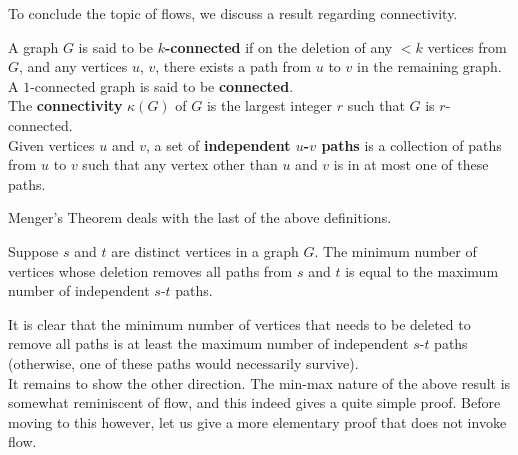 			To conclude the topic of flows, we discuss a result regarding connectivity.

			\begin{fdef}
				A graph $G$ is said to be \textbf{$k$-connected} if on the deletion of any $<k$ vertices from $G$, and any vertices $u$, $v$, there exists a path from $u$ to $v$ in the remaining graph.
				A $1$-connected graph is said to be \textbf{connected}. \\
				The \textbf{connectivity} $\kappa(G)$ of $G$ is the largest integer $r$ such that $G$ is $r$-connected.\\
				Given vertices $u$ and $v$, a set of \textbf{independent $u$-$v$ paths} is a collection of paths from $u$ to $v$ such that any vertex other than $u$ and $v$ is in at most one of these paths.
			\end{fdef}

			Menger's Theorem deals with the last of the above definitions.

			\begin{ftheo}
				Suppose $s$ and $t$ are distinct vertices in a graph $G$. The minimum number of vertices whose deletion removes all paths from $s$ and $t$ is equal to the maximum number of independent $s$-$t$ paths.
			\end{ftheo}

			It is clear that the minimum number of vertices that needs to be deleted to remove all paths is at least the maximum number of independent $s$-$t$ paths (otherwise, one of these paths would necessarily survive).\\
			It remains to show the other direction.
			The min-max nature of the above result is somewhat reminiscent of flow, and this indeed gives a quite simple proof. Before moving to this however, let us give a more elementary proof that does not invoke flow.

